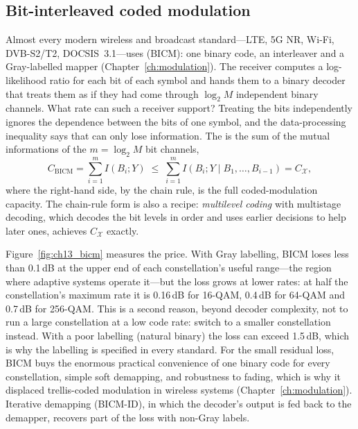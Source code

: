
\subsection{Bit-interleaved coded modulation}

Almost every modern wireless and broadcast standard---LTE, 5G NR, Wi-Fi, DVB-S2/T2, DOCSIS~3.1---uses
 (BICM): one binary code, an interleaver and a Gray-labelled
mapper (Chapter~\ref{ch:modulation}). The receiver computes a log-likelihood ratio for each bit of
each symbol and hands them to a binary decoder that treats them as if they had come through $\log_2M$
independent binary channels. What rate can such a receiver support? Treating the bits
independently ignores the dependence between the bits of one symbol, and the
data-processing inequality says that can only lose information. The  is the sum
of the mutual informations of the $m=\log_2M$ bit channels,
\begin{equation}
C_{\text{BICM}}=\sum_{i=1}^{m}I(B_i;Y)\;\le\;\sum_{i=1}^{m}I(B_i;Y\mid B_1,\ldots,B_{i-1})=C_{\mathcal{X}},
\label{eq:ch13:bicm}
\end{equation}
where the right-hand side, by the chain rule, is the full coded-modulation capacity. The chain-rule
form is also a recipe: \emph{multilevel coding} with multistage decoding, which decodes the bit
levels in order and uses earlier decisions to help later ones, achieves $C_{\mathcal{X}}$ exactly.

Figure~\ref{fig:ch13_bicm} measures the price. With Gray labelling, BICM loses less than 0.1\,dB
at the upper end of each constellation's useful range---the region where adaptive systems operate
it---but the loss grows at lower rates: at half the constellation's maximum rate it is 0.16\,dB
for 16-QAM, 0.4\,dB for 64-QAM and 0.7\,dB for 256-QAM. This is a second reason, beyond decoder
complexity, not to run a large constellation at a low code rate: switch to a smaller constellation
instead. With a poor labelling (natural binary) the loss can exceed 1.5\,dB, which is why the
labelling is specified in every standard. For the small residual loss, BICM buys the enormous
practical convenience of one binary code for every constellation, simple soft demapping, and
robustness to fading, which is why it displaced trellis-coded modulation in wireless systems
(Chapter~\ref{ch:modulation}). Iterative demapping (BICM-ID), in which the decoder's output is fed
back to the demapper, recovers part of the loss with non-Gray labels.

